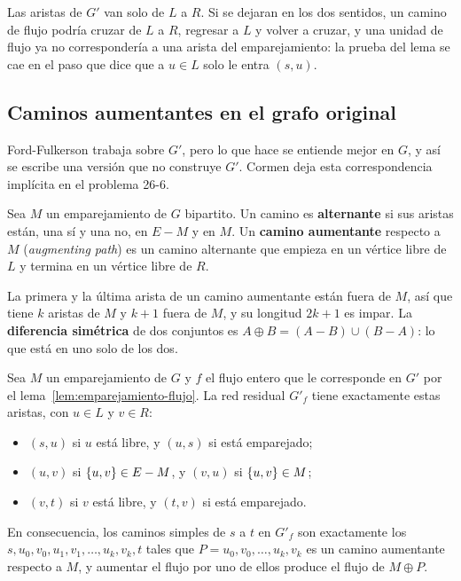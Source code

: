 \documentclass[11pt,letterpaper]{article}
\begin{document}
\begin{ojo}
  Las aristas de $G'$ van solo de $L$ a $R$. Si se dejaran en los dos
  sentidos, un camino de flujo podría cruzar de $L$ a $R$, regresar a
  $L$ y volver a cruzar, y una unidad de flujo ya no correspondería a
  una arista del emparejamiento: la prueba del lema se cae en el paso
  que dice que a $u \in L$ solo le entra $(s, u)$.
\end{ojo}


\subsection*{Caminos aumentantes en el grafo original}

Ford-Fulkerson trabaja sobre $G'$, pero lo que hace se entiende mejor
en $G$, y así se escribe una versión que no construye $G'$. Cormen
deja esta correspondencia implícita en el problema 26-6.

\begin{definicion}
  \label{def:camino-aumentante-emparejamiento}
  Sea $M$ un emparejamiento de $G$ bipartito. Un camino es
  \textbf{alternante} si sus aristas están, una sí y una no, en
  $E - M$ y en $M$. Un \textbf{camino aumentante} respecto a $M$
  (\textit{augmenting path}) es un camino alternante que empieza en
  un vértice libre de $L$ y termina en un vértice libre de $R$.
\end{definicion}

La primera y la última arista de un camino aumentante están fuera de
$M$, así que tiene $k$ aristas de $M$ y $k + 1$ fuera de $M$, y su
longitud $2k + 1$ es impar. La \textbf{diferencia simétrica} de dos
conjuntos es $A \oplus B = (A - B) \cup (B - A)$: lo que está en uno
solo de los dos.

\begin{proposicion}
  \label{prop:emparejamiento-residual}
  Sea $M$ un emparejamiento de $G$ y $f$ el flujo entero que le
  corresponde en $G'$ por el lema~\ref{lem:emparejamiento-flujo}. La
  red residual $G'_f$ tiene exactamente estas aristas, con $u \in L$
  y $v \in R$:
  \begin{itemize}
    \item $(s, u)$ si $u$ está libre, y $(u, s)$ si está emparejado;
    \item $(u, v)$ si $\left\{ u, v \right\} \in E - M$, y $(v, u)$ si
      $\left\{ u, v \right\} \in M$;
    \item $(v, t)$ si $v$ está libre, y $(t, v)$ si está emparejado.
  \end{itemize}
  En consecuencia, los caminos simples de $s$ a $t$ en $G'_f$ son
  exactamente los $s, u_0, v_0, u_1, v_1, \dots, u_k, v_k, t$ tales
  que $P = u_0, v_0, \dots, u_k, v_k$ es un camino aumentante
  respecto a $M$, y aumentar el flujo por uno de ellos produce el
  flujo de $M \oplus P$.
\end{proposicion}
\end{document}
